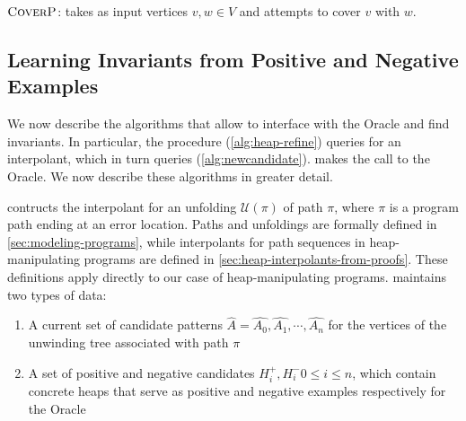 \begin{algorithm}[ht]


  \caption{$\textsc{CoverP}$: takes as input vertices $v, w \in V$ and attempts to cover $v$ with $w$.}
  \label{alg:heap-cover}
\end{algorithm}

\subsection*{Learning Invariants from Positive and Negative Examples}

We now describe the algorithms that allow \verifier to interface with the Oracle and find
invariants. In particular, the  procedure (\autoref{alg:heap-refine}) queries
\seplearner for an interpolant, which in turn queries \newcandidate
(\autoref{alg:newcandidate}). \newcandidate makes the call to the Oracle. We now describe
these algorithms in greater detail.

\seplearner contructs the interpolant for an unfolding $\mathcal{U}(\pi)$ of path $\pi$,
where $\pi$ is a program path ending at an error location. Paths and unfoldings are
formally defined in \autoref{sec:modeling-programs}, while interpolants for path sequences
in heap-manipulating programs are defined in \autoref{sec:heap-interpolants-from-proofs}.
These definitions apply directly to our case of heap-manipulating programs. \seplearner
maintains two types of data:

\begin{enumerate}
  \item A current set of candidate patterns $\hat{A} = \hat{A_0}, \hat{A_1}, \cdots, \hat{A_n}$ for the vertices of the unwinding tree associated with path $\pi$
  \item A set of positive and negative candidates $H_i^{+}, H_i^{-} 0 \leq i \leq n$, which contain concrete heaps that serve as positive and negative examples respectively for the Oracle
\end{enumerate}


